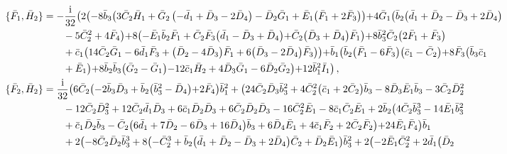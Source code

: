 \documentclass[10pt]{amsart}
\theoremstyle{definition}
\theoremstyle{corollary}
\theoremstyle{remark}
\theoremstyle{conclusion}
\begin{document}
\begin{align}
\{\bar{F}_1, \bar{H}_2\}&=-\frac{{\rm i}}{32}  \bigl(2 \bigl(-8 \bar{b}_3 \bigl(3 \bar{C}_2 \bar{H}_1+\bar{G}_2 \left(-\bar{d}_1+\bar{D}_3-2 \bar{D}_4\right)-\bar{D}_2 \bar{G}_1+\bar{E}_1 \bigl(\bar{F}_1+2 \bar{F}_3\bigl)\bigl)+4 \bar{G}_1 \bigl(\bar{b}_2 \bigl(\bar{d}_1+\bar{D}_2-\bar{D}_3+2 \bar{D}_4\bigl) \nonumber\\
& \hskip 0.7cm-5 \bar{C}_2^2+4 \bar{F}_4\bigl)+8 \bigl(-\bar{E}_1 \bar{b}_2 \bar{F}_1+\bar{C}_2 \bar{F}_3 \bigl(\bar{d}_1-\bar{D}_3+\bar{D}_4\bigl)+\bar{C}_2 \bigl(\bar{D}_3+\bar{D}_4\bigl) \bar{F}_1\bigl)+8 \bar{b}_3^2 \bar{C}_2 \bigl(2 \bar{F}_1+\bar{F}_3\bigl) \nonumber\\
& \hskip 0.7cm+\bar{c}_1 \bigl(14 \bar{C}_2 \bar{G}_1-6 \bar{d}_1 \bar{F}_3+\bigl(\bar{D}_2-4 \bar{D}_3\bigl) \bar{F}_1+6 \bigl(\bar{D}_3-2 \bar{D}_4\bigl) \bar{F}_3\bigl)\bigl)+\bar{b}_1 \bigl(\bar{b}_2 \bigl(\bar{F}_1-6 \bar{F}_3\bigl) \bigl(\bar{c}_1-\bar{C}_2\bigl)+8 \bar{F}_3 \bigl(\bar{b}_3 \bar{c}_1 \nonumber\\
& \hskip 0.7cm+\bar{E}_1\bigl)+8 \bar{b}_2 \bar{b}_3 \bigl(\bar{G}_2-\bar{G}_1\bigl)-12 \bar{c}_1 \bar{H}_2+4 \bar{D}_3 \bar{G}_1-6 \bar{D}_2 \bar{G}_2\bigl)+12 \bar{b}_1^2 \bar{I}_1\bigl) \, , \nonumber\\
\{\bar{F}_2, \bar{H}_2\}&=\frac{\rm i}{32}  \bigl(6 \bar{C}_2 \bigl(-2 \bar{b}_3 \bar{D}_3+\bar{b}_2 \bigl(\bar{b}_3^2-\bar{D}_4\bigl)+2 \bar{F}_4\bigl) \bar{b}_1^2+\bigl(24 \bar{C}_2 \bar{D}_3 \bar{b}_3^2+4 \bar{C}_2^2 \bigl(\bar{c}_1+2 \bar{C}_2\bigl) \bar{b}_3-8 \bar{D}_3 \bar{E}_1 \bar{b}_3-3 \bar{C}_2 \bar{D}_2^2 \nonumber\\
& \hskip 0.7cm-12 \bar{C}_2 \bar{D}_3^2+12 \bar{C}_2 \bar{d}_1 \bar{D}_3+6 \bar{c}_1 \bar{D}_2 \bar{D}_3+6 \bar{C}_2 \bar{D}_2 \bar{D}_3-16 \bar{C}_2^2 \bar{E}_1-8 \bar{c}_1 \bar{C}_2 \bar{E}_1+2 \bar{b}_2 \bigl(4 \bar{C}_2 \bar{b}_3^3-14 \bar{E}_1 \bar{b}_3^2 \nonumber\\
& \hskip 0.7cm+\bar{c}_1 \bar{D}_2 \bar{b}_3-\bar{C}_2 \bigl(6 \bar{d}_1+7 \bar{D}_2-6 \bar{D}_3+16 \bar{D}_4\bigl) \bar{b}_3+6 \bar{D}_4 \bar{E}_1+4 \bar{c}_1 \bar{F}_2+2 \bar{C}_2 \bar{F}_2\bigl)+24 \bar{E}_1 \bar{F}_4\bigl) \bar{b}_1 \nonumber\\
& \hskip 0.7cm+2 \bigl(-8 \bar{C}_2 \bar{D}_2 \bar{b}_3^3+8 \bigl(-\bar{C}_2^3+\bar{b}_2 \bigl(\bar{d}_1+\bar{D}_2-\bar{D}_3+2 \bar{D}_4\bigl) \bar{C}_2+\bar{D}_2 \bar{E}_1\bigl) \bar{b}_3^2+2 \bigl(-2 \bar{E}_1 \bar{C}_2^2+2 \bar{d}_1 \bigl(\bar{D}_2 \nonumber\\

\end{align}
\end{document}
